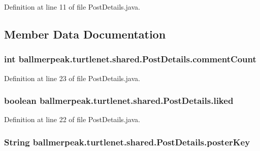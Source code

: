 Definition at line 11 of file Post\-Details.\-java.



\subsection{Member Data Documentation}
\hypertarget{classballmerpeak_1_1turtlenet_1_1shared_1_1PostDetails_a24553cdb518e4501cbdf63263c21d1a0}{
\subsubsection[{comment\-Count}]{\setlength{\rightskip}{0pt plus 5cm}int ballmerpeak.\-turtlenet.\-shared.\-Post\-Details.\-comment\-Count}}\label{classballmerpeak_1_1turtlenet_1_1shared_1_1PostDetails_a24553cdb518e4501cbdf63263c21d1a0}


Definition at line 23 of file Post\-Details.\-java.

\hypertarget{classballmerpeak_1_1turtlenet_1_1shared_1_1PostDetails_aea0cbf8b30b582800479e28eeb1e931f}{
\subsubsection[{liked}]{\setlength{\rightskip}{0pt plus 5cm}boolean ballmerpeak.\-turtlenet.\-shared.\-Post\-Details.\-liked}}\label{classballmerpeak_1_1turtlenet_1_1shared_1_1PostDetails_aea0cbf8b30b582800479e28eeb1e931f}


Definition at line 22 of file Post\-Details.\-java.

\hypertarget{classballmerpeak_1_1turtlenet_1_1shared_1_1PostDetails_a01a466200c299cca8b1cefabb10973d7}{
\subsubsection[{poster\-Key}]{\setlength{\rightskip}{0pt plus 5cm}String ballmerpeak.\-turtlenet.\-shared.\-Post\-Details.\-poster\-Key}}\label{classballmerpeak_1_1turtlenet_1_1shared_1_1PostDetails_a01a466200c299cca8b1cefabb10973d7}


